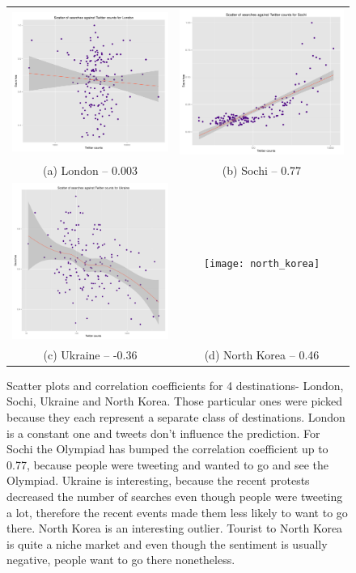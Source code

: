 \documentclass[minf,frontabs,twoside,singlespacing,parskip]{infthesis}
\begin{document}
\begin{figure}[p!]
\begin{tabular}{cc}
  \includegraphics[width=65mm]{London} &   \includegraphics[width=65mm]{Sochi} \\
(a) London -- 0.003 & (b) Sochi -- 0.77 \\[6pt]
 \includegraphics[width=65mm]{Ukraine} &   \texttt{[image: north\_korea]} \\
(c) Ukraine -- -0.36 & (d) North Korea -- 0.46 \\[6pt]
\end{tabular}
\caption{Scatter plots and correlation coefficients for 4 destinations- London, Sochi, Ukraine and North Korea. Those particular ones were picked because they each represent a separate class of destinations. London is a constant one and tweets don't influence the prediction. For Sochi the Olympiad has bumped the correlation coefficient up to 0.77, because people were tweeting and wanted to go and see the Olympiad. Ukraine is interesting, because the recent protests decreased the number of searches even though people were tweeting a lot, therefore the recent events made them less likely to want to go there. North Korea is an interesting outlier. Tourist to North Korea is quite a niche market and even though the sentiment is usually negative, people want to go there nonetheless. }
\end{figure}
\end{document}
